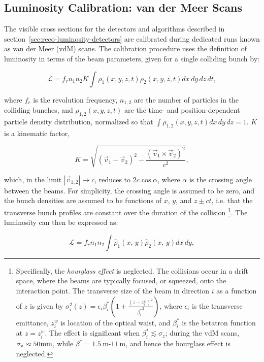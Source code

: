 \subsection{Luminosity Calibration: van der Meer Scans}\label{sec:reco-luminosity-calibration}
The visible cross sections for the detectors and algorithms described in section~\ref{sec:reco-luminosity-detectors} are calibrated during dedicated runs known as van der Meer (vdM) scans. The calibration procedure uses the definition of luminosity in terms of the beam parameters, given for a single colliding bunch by:

\begin{equation}\label{eqn:luminosity-geometrical}
	\mathcal{L} = f_r n_1 n_2 K \int \rho_1(x,y,z,t) \rho_2(x,y,z,t) dx\,dy\,dz\,dt,
\end{equation}

where $f_r$ is the revolution frequency, $n_{1,2}$ are the number of particles in the colliding bunches, and $\rho_{1,2}(x,y,z,t)$ are the time- and position-dependent particle density distribution, normalized so that $\int \rho_{1,2}(x,y,z,t)dx\,dy\,dz = 1$. $K$ is a kinematic factor,

\begin{equation}
	K=\sqrt{(\vec{v}_1-\vec{v}_2)^2 - \frac{(\vec{v}_1\times\vec{v}_2)^2}{c^2}},
\end{equation}

which, in the limit $|\vec{v}_{1,2}|\rightarrow c$, reduces to $2c\cos\alpha$, where $\alpha$ is the crossing angle between the beams. For simplicity, the crossing angle is assumed to be zero, and the bunch densities are assumed to be functions of $x$, $y$, and $z\pm ct$, i.e. that the transverse bunch profiles are constant over the duration of the collision
\footnote{Specifically, the \emph{hourglass effect} is neglected. The collisions occur in a drift space, where the beams are typically focused, or squeezed, onto the interaction point. The transverse size of the beam in direction $i$ as a function of $z$ is given by $\sigma_{i}^2(z)=\epsilon_{i} \beta^*_{i} \left(1+\frac{(z-z_{i}^w)^2}{{\beta^*_{i}}^2}\right)$, where $\epsilon_{i}$ is the transverse emittance, $z_i^w$ is location of the optical waist, and $\beta^*_i$ is the betatron function at $z=z_i^w$. The effect is significant when $\beta^*_i\lesssim \sigma_z$; during the vdM scans, $\sigma_z\approx 50 \mathrm{mm}$, while $\beta^*=1.5~\mbox{m}$-$11~\mbox{m}$, and hence the hourglass effect is neglected.}. The luminosity can then be expressed as:

\begin{equation}
	\mathcal{L}=f_r n_1 n_2 \int \hat{\rho}_1(x,\,y)\hat{\rho}_2(x,\,y) dx\,dy,
\end{equation}

